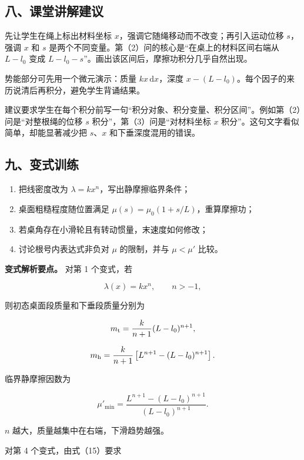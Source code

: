 \documentclass[12pt,a4paper,UTF8]{ctexart}
\newcommand{\tightlist}{\setlength{\itemsep}{0pt}\setlength{\parskip}{0pt}}
\begin{document}
\subsection{八、课堂讲解建议}\label{ux516bux8bfeux5802ux8bb2ux89e3ux5efaux8bae-2}

先让学生在绳上标出材料坐标 \(x\)，强调它随绳移动而不改变；再引入运动位移
\(s\)，强调 \(x\) 和 \(s\)
是两个不同变量。第（2）问的核心是``在桌上的材料区间右端从 \(L-l_0\) 变成
\(L-l_0-s\)''。画出该区间后，摩擦功积分几乎自然出现。

势能部分可先用一个微元演示：质量 \(kx\,\mathrm dx\)，深度
\(x-(L-l_0)\)。每个因子的来历说清后再积分，避免学生背诵结果。

建议要求学生在每个积分前写一句``积分对象、积分变量、积分区间''。例如第（2）问是``对整根绳的位移
\(s\) 积分''，第（3）问是``对材料坐标 \(x\)
积分''。这句文字看似简单，却能显著减少把 \(s\)、\(x\)
和下垂深度混用的错误。

\subsection{九、变式训练}\label{ux4e5dux53d8ux5f0fux8badux7ec3-2}

\begin{enumerate}
\def\labelenumi{\arabic{enumi}.}
\tightlist
\item
  把线密度改为 \(\lambda=kx^n\)，写出静摩擦临界条件；
\item
  桌面粗糙程度随位置满足 \(\mu(s)=\mu_0(1+s/L)\)，重算摩擦功；
\item
  若桌角存在小滑轮且有转动惯量，末速度如何修改；
\item
  讨论根号内表达式非负对 \(\mu\) 的限制，并与 \(\mu<\mu'\) 比较。
\end{enumerate}

\textbf{变式解析要点。} 对第 1 个变式，若

\[
\lambda(x)=kx^n,\qquad n>-1,
\]

则初态桌面段质量和下垂段质量分别为

\[
m_{\rm t}
=\frac{k}{n+1}(L-l_0)^{n+1},
\]

\[
m_{\rm h}
=\frac{k}{n+1}
\left[L^{n+1}-(L-l_0)^{n+1}\right].
\]

临界静摩擦因数为

\[
\mu'_{\min}
=\frac{L^{n+1}-(L-l_0)^{n+1}}
{(L-l_0)^{n+1}}.
\]

\(n\) 越大，质量越集中在右端，下滑趋势越强。

对第 4 个变式，由式（15）要求
\end{document}

